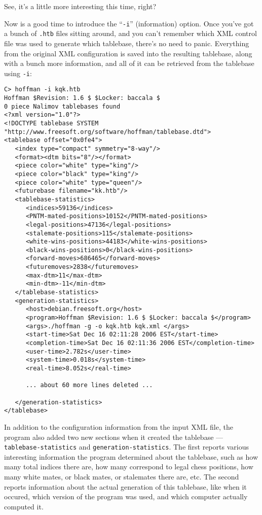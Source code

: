 \documentclass[11pt]{article}
\begin{document}
See, it's a little more interesting this time, right?

Now is a good time to introduce the ``{\tt -i}'' (information) option.
Once you've got a bunch of {\tt .htb} files sitting around, and you
can't remember which XML control file was used to generate which
tablebase, there's no need to panic.  Everything from the original XML
configuration is saved into the resulting tablebase, along with a
bunch more information, and all of it can be retrieved from the
tablebase using {\tt -i}:

{\small\begin{verbatim}
C> hoffman -i kqk.htb
Hoffman $Revision: 1.6 $ $Locker: baccala $
0 piece Nalimov tablebases found
<?xml version="1.0"?>
<!DOCTYPE tablebase SYSTEM "http://www.freesoft.org/software/hoffman/tablebase.dtd">
<tablebase offset="0x0fe4">
   <index type="compact" symmetry="8-way"/>
   <format><dtm bits="8"/></format>
   <piece color="white" type="king"/>
   <piece color="black" type="king"/>
   <piece color="white" type="queen"/>
   <futurebase filename="kk.htb"/>
   <tablebase-statistics>
      <indices>59136</indices>
      <PNTM-mated-positions>10152</PNTM-mated-positions>
      <legal-positions>47136</legal-positions>
      <stalemate-positions>115</stalemate-positions>
      <white-wins-positions>44183</white-wins-positions>
      <black-wins-positions>0</black-wins-positions>
      <forward-moves>686465</forward-moves>
      <futuremoves>2838</futuremoves>
      <max-dtm>11</max-dtm>
      <min-dtm>-11</min-dtm>
   </tablebase-statistics>
   <generation-statistics>
      <host>debian.freesoft.org</host>
      <program>Hoffman $Revision: 1.6 $ $Locker: baccala $</program>
      <args>./hoffman -g -o kqk.htb kqk.xml </args>
      <start-time>Sat Dec 16 02:11:28 2006 EST</start-time>
      <completion-time>Sat Dec 16 02:11:36 2006 EST</completion-time>
      <user-time>2.782s</user-time>
      <system-time>0.018s</system-time>
      <real-time>8.052s</real-time>

      ... about 60 more lines deleted ...

   </generation-statistics>
</tablebase>
\end{verbatim}}

In addition to the configuration information from the input XML file,
the program also added two new sections when it created the tablebase
--- {\tt tablebase-statistics} and {\tt generation-statistics}.  The
first reports various interesting information the program determined
about the tablebase, such as how many total indices there are, how
many correspond to legal chess positions, how many white mates, or
black mates, or stalemates there are, etc.  The second reports
information about the actual generation of this tablebase, like when
it occured, which version of the program was used, and which computer
actually computed it.
\end{document}

